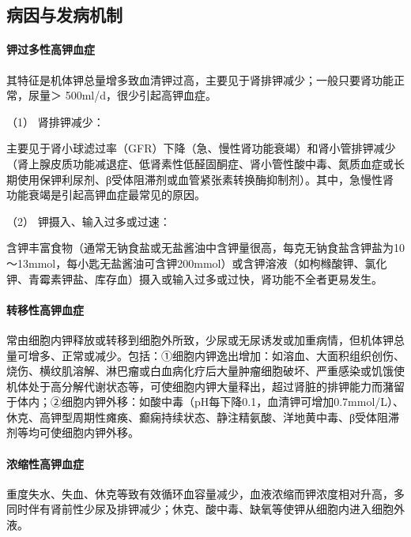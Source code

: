 \subsection{病因与发病机制}

\paragraph{钾过多性高钾血症}

其特征是机体钾总量增多致血清钾过高，主要见于肾排钾减少；一般只要肾功能正常，尿量＞
500ml/d，很少引起高钾血症。

\hypertarget{text00195.htmlux5cux23CHP6-2-1-1-1-1}{}
（1） 肾排钾减少：

主要见于肾小球滤过率（GFR）下降（急、慢性肾功能衰竭）和肾小管排钾减少（肾上腺皮质功能减退症、低肾素性低醛固酮症、肾小管性酸中毒、氮质血症或长期使用保钾利尿剂、β受体阻滞剂或血管紧张素转换酶抑制剂）。其中，急慢性肾功能衰竭是引起高钾血症最常见的原因。

\hypertarget{text00195.htmlux5cux23CHP6-2-1-1-1-2}{}
（2） 钾摄入、输入过多或过速：

含钾丰富食物（通常无钠食盐或无盐酱油中含钾量很高，每克无钠食盐含钾盐为10～13mmol，每小匙无盐酱油可含钾200mmol）或含钾溶液（如枸橼酸钾、氯化钾、青霉素钾盐、库存血）摄入或输入过多或过快，肾功能不全者更易发生。

\paragraph{转移性高钾血症}

常由细胞内钾释放或转移到细胞外所致，少尿或无尿诱发或加重病情，但机体钾总量可增多、正常或减少。包括：①细胞内钾逸出增加：如溶血、大面积组织创伤、烧伤、横纹肌溶解、淋巴瘤或白血病化疗后大量肿瘤细胞破坏、严重感染或饥饿使机体处于高分解代谢状态等，可使细胞内钾大量释出，超过肾脏的排钾能力而潴留于体内；②细胞内钾外移：如酸中毒（pH每下降0.1，血清钾可增加0.7mmol/L）、休克、高钾型周期性瘫痪、癫痫持续状态、静注精氨酸、洋地黄中毒、β受体阻滞剂等均可使细胞内钾外移。

\paragraph{浓缩性高钾血症}

重度失水、失血、休克等致有效循环血容量减少，血液浓缩而钾浓度相对升高，多同时伴有肾前性少尿及排钾减少；休克、酸中毒、缺氧等使钾从细胞内进入细胞外液。

